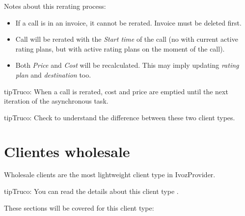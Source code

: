 \documentclass[letterpaper,10pt,spanish]{sphinxmanual}
\begin{document}
Notes about this rerating process:
\begin{itemize}
\item {} 
If a call is in an invoice, it cannot be rerated. Invoice must be deleted first.

\item {} 
Call will be rerated with the \emph{Start time} of the call (no with current active rating plans, but with active rating plans
on the moment of the call).

\item {} 
Both \emph{Price} and \emph{Cost} will be recalculated. This may imply updating \emph{rating plan} and \emph{destination} too.

\end{itemize}

\begin{notice}{tip}{Truco:}
When a call is rerated, cost and price are emptied until the next iteration of the asynchronous task.
\end{notice}

\begin{notice}{tip}{Truco:}
Check {\hyperref[administration_portal/brand/clients/retail:differences\string-between\string-retail\string-and\string-residential\string-clients]{}} to understand the difference between these two
client types.
\end{notice}
\label{administration_portal/client/wholesale/index:wholesale-clients}

\section{Clientes wholesale}
\label{administration_portal/client/wholesale/index:clientes-wholesale}\label{administration_portal/client/wholesale/index:wholesale-clients}\label{administration_portal/client/wholesale/index::doc}\label{administration_portal/client/wholesale/index:id1}
Wholesale clients are the most lightweight client type in IvozProvider.

\begin{notice}{tip}{Truco:}
You can read the details about this client type {\hyperref[administration_portal/brand/clients/wholesale:wholesale\string-clients]{}}.
\end{notice}

These sections will be covered for this client type:
\end{document}

